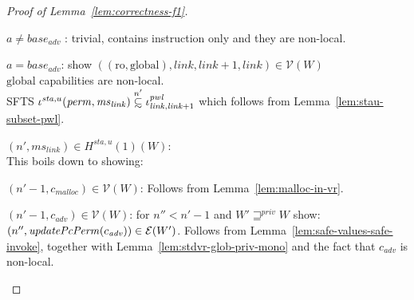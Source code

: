 \documentclass[a4paper]{article}
\newcommand\subsetsim{\mathrel{\ooalign{\raise.2ex\hbox{$\subset$}\cr
      \hidewidth\lower.8ex\hbox{\scalebox{0.9}{$\sim$}}\hidewidth\cr}}}
\newcommand{\nsubsim}[1][n]{\stackrel{\tiny{#1}}{\subsetsim}}
\newcommand{\var}[1]{\mathit{#1}}
\newcommand{\hs}{\var{ms}}
\newcommand{\ms}{\hs}
\newcommand{\start}{\var{base}}
\newcommand{\perm}{\var{perm}}
\newcommand{\adv}{\var{adv}}
\newcommand{\link}{\var{link}}
\newcommand{\pwl}{\var{pwl}}
\newcommand{\sta}{\var{sta}}
\newcommand{\plainfun}[2]{
  \ifthenelse{\equal{#2}{}}
  {\mathit{#1}}
  {\mathit{#1}(#2)}
}
\newcommand{\updatePcPerm}[1]{\plainfun{updatePcPerm}{#1}}
\newcommand{\futurestr}{\mathbin{\sqsupseteq}^{\var{priv}}}
\newcommand{\codelabel}[1]{\mathit{#1}}
\newcommand{\malloc}{\codelabel{malloc}}
\newcommand{\asmType}{\plaindom{AsmType}}
\newcommand{\plaindom}[1]{\mathrm{#1}}
\newcommand{\intr}[2]{\mathcal{#1}}
\newcommand{\valueintr}[1]{\intr{V}{#1}}
\newcommand{\exprintr}[1]{\intr{E}{#1}}
\newcommand{\stdvr}{\valueintr{\asmType}}
\newcommand{\stder}{\exprintr{\asmType}}
\newcommand{\npair}[2][n]{\left(#1,#2 \right)}
\newcommand{\plainperm}[1]{\mathrm{#1}}
\newcommand{\readonly}{\plainperm{ro}}
\newcommand{\glob}{\plainperm{global}}
\begin{document}
\begin{proof}[Proof of Lemma~\ref{lem:correctness-f1}]
\begin{enumproof}[resume]
\begin{enumproof}
\begin{enumproof}
        \begin{enumproof}
        \item $a \neq \start_\adv$ : trivial, contains instruction only and they are non-local.
        \item $a = \start_\adv$: show $((\readonly,\glob),\link,\link+1,\link) \in \stdvr(W)$\\
          $\glob$ capabilities are non-local.\\
          SFTS $\iota^{\sta,u}(\perm,\ms_\link) \nsubsim[n'] \iota^\pwl_{\link,\link+1}$ which follows from Lemma~\ref{lem:stau-subset-pwl}.
        \end{enumproof}
      \item $\npair[n']{\ms_\link} \in H^{\sta,u}(1)(W)$:\\
        This boils down to showing:
        \begin{enumproof}
        \item $\npair[n'-1]{c_\malloc} \in \stdvr(W)$: Follows from Lemma~\ref{lem:malloc-in-vr}.

        \item $\npair[n'-1]{c_\adv} \in \stdvr(W)$: for $n'' < n'-1$ and $W'
          \futurestr W$ show: \\$\npair[n'']{\updatePcPerm{c_\adv}} \in
          \stder(W')$. Follows from Lemma~\ref{lem:safe-values-safe-invoke},
          together with Lemma~\ref{lem:stdvr-glob-priv-mono} and the fact that
          $c_\adv$ is non-local.  \label{f1:adv}
        \end{enumproof}


\end{enumproof}
\end{enumproof}
\end{enumproof}
\end{proof}
\end{document}
